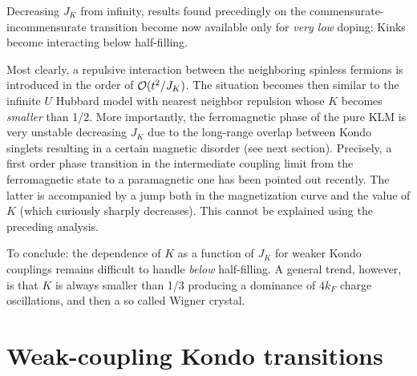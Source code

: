 Decreasing $J_K$ from infinity, results found precedingly on the
commensurate-incommensurate transition 
become now available only for 
\emph{very low} doping: Kinks become interacting below half-filling. 

Most clearly, a repulsive interaction
between the neighboring spinless fermions is introduced in the order
of ${\cal O}(t^2/J_K)$\cite{Ueda_review}. The situation becomes then similar
to the infinite $U$ Hubbard model with nearest neighbor
repulsion whose $K$ becomes {\it smaller} than 1/2\cite{Schulz3}.
More importantly, the ferromagnetic phase of the
pure KLM is very unstable decreasing $J_K$
due to the long-range overlap between Kondo singlets resulting in a certain
magnetic disorder (see next section). Precisely, 
a first order phase transition in the intermediate coupling
limit from the ferromagnetic state to a paramagnetic one
has been pointed out recently\cite{Tsvelik_LL}. The latter
is accompanied by a 
jump both in the magnetization curve and the value of 
$K$ (which curiously sharply decreases). This cannot be explained using
the preceding analysis. 

To conclude: the dependence of $K$ as a function of $J_K$
for weaker Kondo couplings remains difficult to handle \emph{below}
half-filling. A general trend, however,
is that $K$ is always smaller than 1/3 producing
a dominance of $4k_F$ charge oscillations, and then a so called
Wigner crystal. 

\section{Weak-coupling Kondo transitions}

